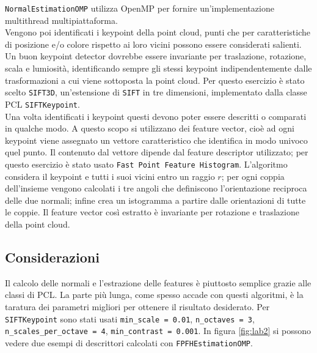 \documentclass[a4paper]{article}
\begin{document}
	\verb|NormalEstimationOMP| utilizza OpenMP per fornire un'implementazione multithread multipiattaforma. \\
	Vengono poi identificati i keypoint della point cloud, punti che per caratteristiche di posizione e/o colore rispetto ai loro vicini possono essere considerati salienti. Un buon keypoint detector dovrebbe essere invariante per traslazione, rotazione, scala e lumiosità, identificando sempre gli stessi keypoint indipendentemente dalle trasformazioni a cui viene sottoposta la point cloud. Per questo esercizio è stato scelto \verb|SIFT3D|, un'estensione di \verb|SIFT| in tre dimensioni, implementato dalla classe PCL \verb|SIFTKeypoint|. \\
	Una volta identificati i keypoint questi devono poter essere descritti o comparati in qualche modo. A questo scopo si utilizzano dei feature vector, cioè ad ogni keypoint viene assegnato un vettore caratteristico che identifica in modo univoco quel punto. Il contenuto dal vettore dipende dal feature descriptor utilizzato; per questo esercizio è stato usato \verb|Fast Point Feature Histogram|. L'algoritmo considera il keypoint e tutti i suoi vicini entro un raggio $r$; per ogni coppia dell'insieme vengono calcolati i tre angoli che definiscono l'orientazione reciproca delle due normali; infine crea un istogramma a partire dalle orientazioni di tutte le coppie. Il feature vector così estratto è invariante per rotazione e traslazione della point cloud.

	\subsection{Considerazioni} \label{sec:lab2_disc}
	Il calcolo delle normali e l'estrazione delle features è piuttosto semplice grazie alle classi di PCL. La parte più lunga, come spesso accade con questi algoritmi, è la taratura dei parametri migliori per ottenere il risultato desiderato. Per \verb|SIFTKeypoint| sono stati usati \verb|min_scale = 0.01|, \verb|n_octaves = 3|, \verb|n_scales_per_octave = 4|, \verb|min_contrast = 0.001|. In figura \ref{fig:lab2} si possono vedere due esempi di descrittori calcolati con \verb|FPFHEstimationOMP|.
	
\end{document}
